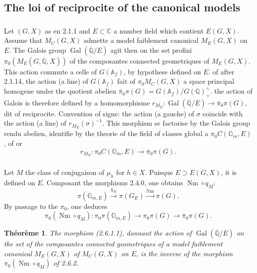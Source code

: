 \documentclass[12pt,a4paper]{article}
\theoremstyle{plain}
\newtheorem{theorem}{Th\'eor\`eme}[section]
\theoremstyle{definition}
\theoremstyle{remark}
\DeclareMathOperator{\Gal}{Gal}
\DeclareMathOperator{\Nm}{Nm}
\newcommand{\QQ}{\mathbb{Q}}
\newcommand{\CC}{\mathbb{C}}
\newcommand{\Af}{\mathbb{A}_f}
\newcommand{\Gm}{\mathbb{G}}
\begin{document}
\subsection{The loi of reciprocite of the canonical models}

\subsubsection{}

Let $(G,X)$ as en 2.1.1 and $E \subset \CC$ a number field which contient $E(G,X)$. Assume that $M_C(G,X)$ admette a model faiblement canonical $M_E(G,X)$ on $E$. The Galois group $\Gal(\overline{\QQ}/E)$ agit then on the set profini $\pi_0(M_E(G,\overline{\QQ},X))$ of the composantes connected geometriques of $M_E(G,X)$. This action commute a celle of $G(\Af)$, by hypothese defined on $E$. of after 2.1.14, the action (a line) of $G(\Af)$ fait of $\pi_0 M_C(G,X)$ a space principal homogene under the quotient abelien $\bar{\pi}_0\pi(G) = G(\Af)/G(\QQ)_+^{\wedge}$. the action of Galois is therefore defined by a homomorphisme $r_{M_E}: \Gal(\overline{\QQ}/E) \to \bar{\pi}_0\pi(G)$, dit of reciprocite. Convention of signe: the action (a gauche) of $\sigma$ coincide with the action (a line) of $r_{M_E}(\sigma)^{-1}$. This morphism se factorise by the Galois group rendu abelien, identifie by the theorie of the field of classes global a $\pi_0 C(\Gm_m,E)$, of or
\begin{equation}\label{eq:2.6.1.1}
r_{M_E}: \pi_0 C(\Gm_m,E) \to \bar{\pi}_0\pi(G).
\end{equation}

\subsubsection{}

Let $M$ the class of conjugaison of $\mu_h$ for $h \in X$. Puisque $E \supset E(G,X)$, it is defined on $E$. Composant the morphisms 2.4.0, one obtains $\Nm \circ q_M$:
\[
\pi(\Gm_{m,E}) \xrightarrow{q_M} \pi(G_E) \xrightarrow{\Nm} \pi(G).
\]
By passage to the $\pi_0$, one deduces
\begin{equation}\label{eq:2.6.2.1}
\pi_0(\Nm \circ q_M): \pi_0\pi(\Gm_{m,E}) \to \pi_0\pi(G) \to \bar{\pi}_0\pi(G).
\end{equation}

\begin{theorem}
The morphism (2.6.1.1), donnant the action of $\Gal(\overline{\QQ}/E)$ on the set of the composantes connected geometriques of a model faiblement canonical $M_E(G,X)$ of $M_C(G,X)$ on $E$, is the inverse of the morphism $\pi_0(\Nm \circ q_M)$ of 2.6.2.
\end{theorem}
\end{document}
